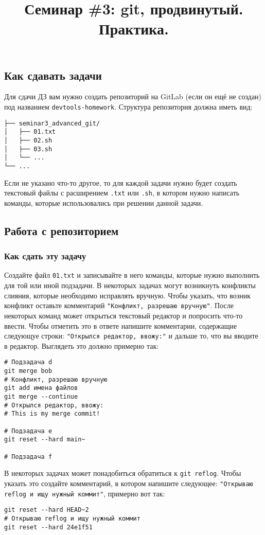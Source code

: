 \documentclass{article}
\begin{document}
\title{Семинар \#3: git, продвинутый. Практика. \vspace{-5ex}}\date{}\maketitle

\subsection*{Как сдавать задачи}
Для сдачи ДЗ вам нужно создать репозиторий на GitLab (если он ещё не создан) под названием \texttt{devtools-homework}. Структура репозитория должна иметь вид:
\begin{center}
\begin{BVerbatim}
├── seminar3_advanced_git/
│   ├── 01.txt
│   ├── 02.sh
│   ├── 03.sh
│   └── ...
└── ...
\end{BVerbatim}
\end{center}
Если не указано что-то другое, то для каждой задачи нужно будет создать текстовый файлы с расширением \texttt{.txt} или \texttt{.sh}, в котором нужно написать команды, которые использовались при решении данной задачи. 

\subsection{Работа с репозиторием}
\subsubsection*{Как сдать эту задачу}
Создайте файл \texttt{01.txt} и записывайте в него команды, которые нужно выполнить для той или иной подзадачи. В некоторых задачах могут возникнуть конфликты слияния, которые необходимо исправлять вручную. Чтобы указать, что возник конфликт оставьте комментарий \texttt{"Конфликт, разрешаю вручную"}. После некоторых команд может открыться текстовый редактор и попросить что-то ввести. Чтобы отметить это в ответе напишите комментарии, содержащие следующуе строки: \texttt{"Открылся редактор, ввожу:"} и дальше то, что вы вводите в редактор. Выглядеть это должно примерно так:
\begin{lstlisting}
# Подзадача d
git merge bob
# Конфликт, разрешаю вручную
git add имена файлов
git merge --continue
# Открылся редактор, ввожу:
# This is my merge commit!

# Подзадача e
git reset --hard main~

# Подзадача f
\end{lstlisting}
В некоторых задачах может понадобиться обратиться к \texttt{git reflog}. Чтобы указать это создайте комментарий, в котором напишите следующее: \texttt{"Открываю reflog и ищу нужный коммит"}, примерно вот так:
\begin{lstlisting}
git reset --hard HEAD~2
# Открываю reflog и ищу нужный коммит
git reset --hard 24e1f51
\end{lstlisting}
\end{document}
